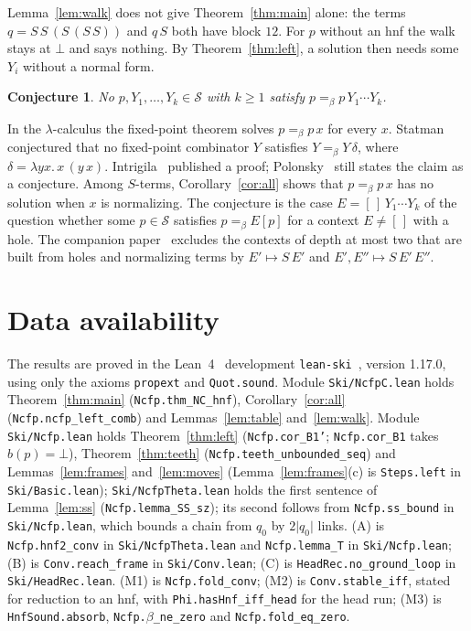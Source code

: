 \documentclass[11pt]{amsart}
\newtheorem{conjecture}[theorem]{Conjecture}
\newcommand{\Ter}{\mathcal S}
\newcommand{\conv}{=_\beta}
\newcommand{\bl}{b}
\newcommand{\sz}[1]{\lvert#1\rvert}
\begin{document}
Lemma~\ref{lem:walk} does not give Theorem~\ref{thm:main} alone: the terms $q=S\,S\,(S\,(S\,S))$
and $q\,S$ both have block $12$. For $p$ without an hnf the walk stays at $\bot$ and says nothing.
By Theorem~\ref{thm:left}, a solution then needs some $Y_i$ without a normal form.

\begin{conjecture}
No $p,Y_1,\dots,Y_k\in\Ter$ with $k\ge1$ satisfy $p\conv p\,Y_1\cdots Y_k$.
\end{conjecture}

\noindent In the $\lambda$-calculus the fixed-point theorem solves $p\conv p\,x$ for every $x$. Statman conjectured that no fixed-point combinator $Y$ satisfies $Y\conv Y\,\delta$, where
$\delta=\lambda yx.\,x\,(y\,x)$. Intrigila~\citep{intrigila} published a proof; Polonsky~\citep{polonsky}
still states the claim as a conjecture. Among $S$-terms, Corollary~\ref{cor:all} shows that $p\conv p\,x$ has no solution when $x$ is
normalizing. The conjecture is the case
$E=[\,]\,Y_1\cdots Y_k$ of the question whether some $p\in\Ter$ satisfies $p\conv E[p]$ for a
context $E\ne[\,]$ with a hole. The companion paper~\citep{s8} excludes the contexts of depth at
most two that are built from holes and normalizing terms by $E'\mapsto S\,E'$ and
$E',E''\mapsto S\,E'\,E''$.

\section*{Data availability}
\sloppy
The results are proved in the Lean~4~\citep{lean4} development \texttt{lean-ski}~\citep{leanski},
version 1.17.0, using only the axioms \texttt{propext} and \texttt{Quot.sound}. Module
\texttt{Ski/NcfpC.lean} holds Theorem~\ref{thm:main} (\texttt{Ncfp.thm\_NC\_hnf}),
Corollary~\ref{cor:all} (\texttt{Ncfp.ncfp\_left\_comb}) and Lemmas~\ref{lem:table}
and~\ref{lem:walk}. Module \texttt{Ski/Ncfp.lean} holds Theorem~\ref{thm:left}
(\texttt{Ncfp.cor\_B1'}; \texttt{Ncfp.cor\_B1} takes $\bl(p)=\bot$), Theorem~\ref{thm:teeth} (\texttt{Ncfp.teeth\_unbounded\_seq}) and
Lemmas~\ref{lem:frames} and~\ref{lem:moves} (Lemma~\ref{lem:frames}(c) is \texttt{Steps.left} in
\texttt{Ski/Basic.lean}); \texttt{Ski/NcfpTheta.lean} holds the first sentence of
Lemma~\ref{lem:ss} (\texttt{Ncfp.lemma\_SS\_sz}); its second follows from \texttt{Ncfp.ss\_bound}
in \texttt{Ski/Ncfp.lean}, which bounds a chain from $q_0$ by $2\sz{q_0}$ links. (A) is \texttt{Ncfp.hnf2\_conv} in
\texttt{Ski/NcfpTheta.lean} and \texttt{Ncfp.lemma\_T} in \texttt{Ski/Ncfp.lean}; (B) is
\texttt{Conv.reach\_frame} in \texttt{Ski/Conv.lean}; (C) is \texttt{HeadRec.no\_ground\_loop} in
\texttt{Ski/HeadRec.lean}. (M1) is \texttt{Ncfp.fold\_conv}; (M2) is \texttt{Conv.stable\_iff}, stated
for reduction to an hnf, with \texttt{Phi.hasHnf\_iff\_head} for the head run; (M3) is
\texttt{HnfSound.absorb}, \texttt{Ncfp.}$\beta$\texttt{\_ne\_zero} and
\texttt{Ncfp.fold\_eq\_zero}.
\end{document}
